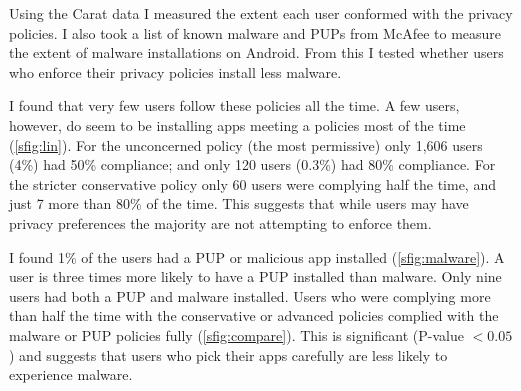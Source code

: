 \documentclass[a4paper]{scrartcl}
\begin{document}
Using the Carat data I measured the extent each user conformed with the privacy policies.
I also took a list of known malware and \acp{PUP} from McAfee to measure the extent of malware installations on Android.
From this I tested whether users who enforce their privacy policies install less malware.

I found that very few users follow these policies all the time.
A few users, however, do seem to be installing apps meeting a policies most of the time (\autoref{sfig:lin}).
For the unconcerned policy (the most permissive) only 1,606 users (4\%) had 50\% compliance;
and only 120 users (0.3\%) had 80\% compliance.
For the stricter conservative policy only 60 users were complying half the time, and just 7 more than 80\% of the time.
This suggests that while users may have privacy preferences the majority are not attempting to enforce them.

I found 1\% of the users had a PUP or malicious app installed (\autoref{sfig:malware}).
A user is three times more likely to have a PUP installed than malware.
Only nine users had both a PUP and malware installed.
Users who were complying more than half the time with the conservative or advanced policies complied with the malware or PUP policies fully (\autoref{sfig:compare}).
This is significant (P-value $< 0.05$) and suggests that users who pick their apps carefully are less likely to experience malware.
\end{document}
